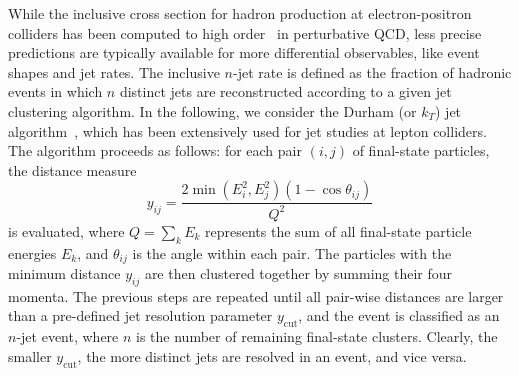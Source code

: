 \documentclass[10pt,aps,prl,superscriptaddress,twocolumn,preprintnumbers,nofootinbib]{revtex4-2}
\newcommand{\ycut}{y_{\mathrm{cut}}}
\begin{document}
While the inclusive cross section for hadron production at electron-positron colliders has been computed to high order~\cite{Gorishnii:1990vf,Surguladze:1990tg,Chetyrkin:1996ela,Baikov:2008jh,Baikov:2010je,Baikov:2012er} in perturbative QCD, less precise predictions are typically available for more differential observables, like event shapes and jet rates. The inclusive $n$-jet rate is defined as the fraction of hadronic events in which $n$ distinct jets are reconstructed according to a given jet clustering algorithm. In the following, we consider the Durham (or $k_T$) jet algorithm~\cite{Catani:1991hj,Brown:1990nm,Brown:1991hx,Stirling:1991ds,Bethke:1991wk}, which has been extensively used for jet studies at lepton colliders. The algorithm proceeds as follows: for each pair $(i,j)$ of final-state particles, the distance measure
\begin{equation}
    y_{ij}=\dfrac{2\min(E_i^2,E_j^2)(1-\cos\theta_{ij})}{Q^2}
\end{equation}
is evaluated, where $Q=\sum_k E_k$ represents the sum of all final-state particle energies $E_k$, and $\theta_{ij}$ is the angle within each pair. The particles with the minimum distance $y_{ij}$ are then clustered together by summing their four momenta. The previous steps are repeated until all pair-wise distances are larger than a pre-defined jet resolution parameter $\ycut$, and the event is classified as an $n$-jet event, where $n$ is the number of remaining final-state clusters. Clearly, the smaller $\ycut$, the more distinct jets are resolved in an event, and vice versa.
\end{document}
